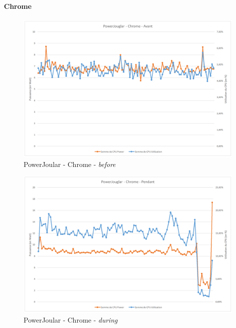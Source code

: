 \documentclass[12pt, a4paper]{report}
\begin{document}
\paragraph{
\textbf{Chrome}\newline
}
\begin{figure}[H]
    \includegraphics[width=1\linewidth]{res//graph/PowerJoular/chrome-avant.png}
    \caption{PowerJoular - Chrome - \textit{before}}
    \label{fig:pj_chrome_before}
\end{figure}
\begin{figure}[H]
    \includegraphics[width=1\linewidth]{res//graph/PowerJoular/chrome-during.png}
    \caption{PowerJoular - Chrome - \textit{during}}
    \label{fig:pj_chrome_during}
\end{figure}
\end{document}
